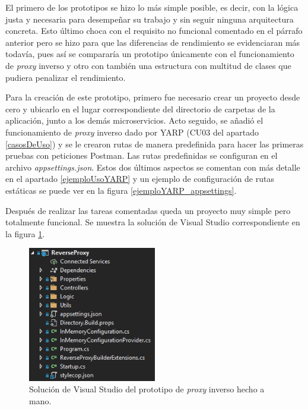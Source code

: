 \documentclass[11pt,spanish,listoffigures]{tfgetsinf}
\begin{document}
El primero de los prototipos se hizo lo más simple posible, es decir, con la lógica justa y necesaria para desempeñar su trabajo y sin seguir ninguna arquitectura concreta. Esto último choca con el requisito no funcional comentado en el párrafo anterior pero se hizo para que las diferencias de rendimiento se evidenciaran más todavía, pues así se compararía un prototipo únicamente con el funcionamiento de \emph{proxy} inverso y otro con también una estructura con multitud de clases que pudiera penalizar el rendimiento.

Para la creación de este prototipo, primero fue necesario crear un proyecto desde cero y ubicarlo en el lugar correspondiente del directorio de carpetas de la aplicación, junto a los demás microservicios. Acto seguido, se añadió el funcionamiento de \emph{proxy} inverso dado por YARP (CU03 del apartado \ref{casosDeUso}) y se le crearon rutas de manera predefinida para hacer las primeras pruebas con peticiones Postman. Las rutas predefinidas se configuran en el archivo \emph{appsettings.json}. Estos dos últimos aspectos se comentan con más detalle en el apartado \ref{ejemploUsoYARP} y un ejemplo de configuración de rutas estáticas se puede ver en la figura \ref{ejemploYARP_appsettings}.

Después de realizar las tareas comentadas queda un proyecto muy simple pero totalmente funcional. Se muestra la solución de Visual Studio correspondiente en la figura \ref{prototipoMano}.

\begin{figure}[ht]
\centering
\includegraphics[width=0.5\textwidth]{imagenes/prototipoMano}
\caption{Solución de Visual Studio del prototipo de \emph{proxy} inverso hecho a mano.}
	\label{prototipoMano}
\end{figure}

\end{document}
